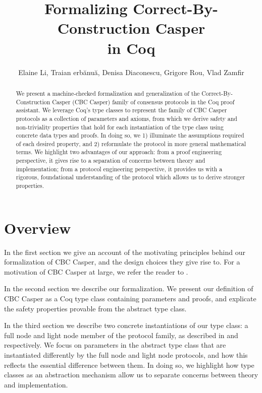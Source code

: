 \documentclass[runningheads]{llncs}
\begin{document}
	
\title{Formalizing Correct-By-Construction Casper \\ in Coq}

\author{Elaine Li, Traian erbănuă, Denisa Diaconescu, Grigore Rou, Vlad Zamfir}

\maketitle

\begin{abstract}
We present a machine-checked formalization and generalization of the Correct-By-Construction Casper (CBC Casper) family of consensus protocols in the Coq proof assistant. We leverage Coq's type classes to represent the family of CBC Casper protocols as a collection of parameters and axioms, from which we derive safety and non-triviality properties that hold for each instantiation of the type class using concrete data types and proofs. In doing so, we 1) illuminate the assumptions required of each desired property, and 2) reformulate the protocol in more general mathematical terms. We highlight two advantages of our approach: from a proof engineering perspective, it gives rise to a separation of concerns between theory and implementation; from a protocol engineering perspective, it provides us with a rigorous, foundational understanding of the protocol which allows us to derive stronger properties. 
\end{abstract}

\section{Overview} 
In the first section we give an account of the motivating principles behind our formalization of CBC Casper, and the design choices they give rise to. For a motivation of CBC Casper at large, we refer the reader to \cite{CBCfull}. 

In the second section we describe our formalization. We present our definition of CBC Casper as a Coq type class containing parameters and proofs, and explicate the safety properties provable from the abstract type class. 

In the third section we describe two concrete instantiations of our type class: a full node and light node member of the protocol family, as described in \cite{CBCfull} and \cite{CBClight} respectively. We focus on parameters in the abstract type class that are instantiated differently by the full node and light node protocols, and how this reflects the essential difference between them. In doing so, we highlight how type classes as an abstraction mechanism allow us to separate concerns between theory and implementation. 
\end{document}
